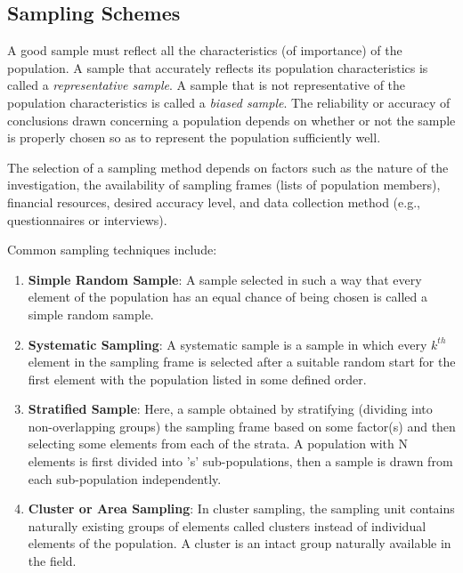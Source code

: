 \documentclass{article}
\begin{document}
        \subsection{Sampling Schemes}

        A good sample must reflect all the characteristics (of importance) of the population. A sample that accurately reflects its population characteristics is called a \textit{representative sample}. A sample that is not representative of the population characteristics is called a \textit{biased sample}. The reliability or accuracy of conclusions drawn concerning a population depends on whether or not the sample is properly chosen so as to represent the population sufficiently well. \cite{stats_applications}

        \noindent The selection of a sampling method depends on factors such as the nature of the investigation, the availability of sampling frames (lists of population members), financial resources, desired accuracy level, and data collection method (e.g., questionnaires or interviews). 

        \noindent Common sampling techniques include:

        \begin{enumerate}
            \item \textbf{Simple Random Sample}: A sample selected in such a way that every element of the population has an equal chance of being chosen is called a simple random sample.
            
            \item \textbf{Systematic Sampling}: A systematic sample is a sample in which every $k^{th}$ element in the sampling frame is selected after a suitable random start for the first element with the population listed in some defined order.
            
            \item \textbf{Stratified Sample}: Here, a sample obtained by stratifying (dividing into non-overlapping groups) the sampling frame based on some factor(s) and then selecting some elements from each of the strata. A population with N elements is first divided into 's' sub-populations, then a sample is drawn from each sub-population independently. 

            \item \textbf{Cluster or Area Sampling}: In cluster sampling, the sampling unit contains naturally existing groups of elements called clusters instead of individual elements of the population. A cluster is an intact group naturally available in the field.
            
        \end{enumerate}
\end{document}
